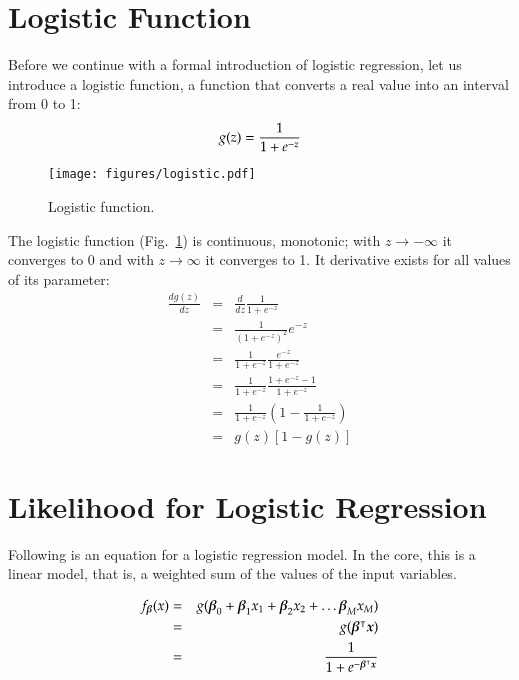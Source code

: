 \begin{refsection}
\section{Logistic Function}

Before we continue with a formal introduction of logistic regression, let us introduce a logistic function, a function that converts a real value into an interval from 0 to 1:
\begin{equation}
  g(z) = {1\over 1+e^{-z}}
\end{equation}

\begin{figure}[htbp]
\begin{center}
\texttt{[image: figures/logistic.pdf]}
\caption{Logistic function.}
\label{f:logistic-function}
\end{center}
\end{figure}

The logistic function (Fig.~\ref{f:logistic-function}) is continuous, monotonic; with $z\to -\infty$ it converges to 0 and with $z\to\infty$ it converges to 1. It derivative exists for all values of its parameter:
\begin{eqnarray}
  \frac{dg(z)}{dz} & = & \frac{d}{dz} \frac{1}{1+e^{-z}} \nonumber \\
  & = & \frac{1}{(1+e^{-z})^2} e^{-z} \nonumber \\
  & = & \frac{1}{1+e^{-z}}\frac{e^{-z}}{1+e^{-z}} \nonumber \\
  & = & \frac{1}{1+e^{-z}}\frac{1+e^{-z}-1}{1+e^{-z}} \nonumber \\
  & = & \frac{1}{1+e^{-z}}\left(1-\frac{1}{1+e^{-z}}\right) \nonumber \\
  & = & g(z)[1-g(z)]
\end{eqnarray}

\section{Likelihood for Logistic Regression}

Following is an equation for a logistic regression model. In the core, this is a linear model, that is, a weighted sum of the values of the input variables. 

\begin{eqnarray}
  f_{\boldsymbol{\beta}}(x) & = & g(\boldsymbol{\beta}_0+\boldsymbol{\beta}_1 x_1+\boldsymbol{\beta}_2 x_2+\ldots\boldsymbol{\beta}_M x_M)
  \nonumber \\
  & = & g(\boldsymbol{\beta}^\intercal \boldsymbol{x}) \nonumber \\
  & = & \frac{1}{1+e^{-\boldsymbol{\beta}^\intercal \boldsymbol{x}}}
  \label{eq:logreg}
\end{eqnarray}


\end{refsection}

